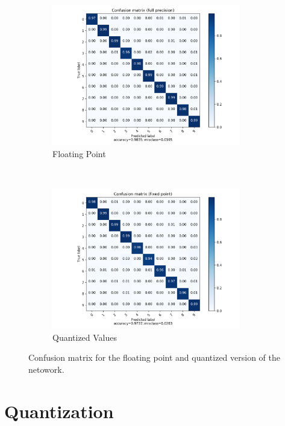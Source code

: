 \begin{figure}
\centering
\begin{subfigure}[t]{0.5\textwidth}
	\includegraphics[width=0.9\textwidth]{../../net/images/cm}
	\caption{Floating Point}
	\label{fig:network-test-cm}
\end{subfigure}%
~
\begin{subfigure}[t]{0.5\textwidth}
	\includegraphics[width=0.9\textwidth]{../../net/images/qcm}
	\caption{Quantized Values}
	\label{fig:network-test-qcm}
\end{subfigure}
\caption{Confusion matrix for the floating point and quantized version of the netowork.}
\label{fig:network-confusion-matrix}
\end{figure}

\section{Quantization}

